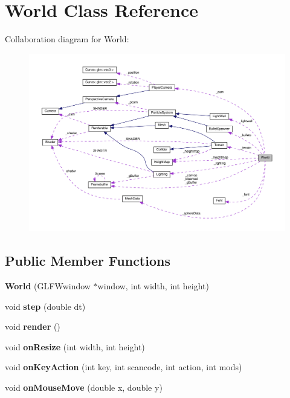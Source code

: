 \hypertarget{class_world}{}\section{World Class Reference}
\label{class_world}


Collaboration diagram for World\+:\nopagebreak
\begin{figure}[H]
\begin{center}
\leavevmode
\includegraphics[width=350pt]{class_world__coll__graph}
\end{center}
\end{figure}
\subsection*{Public Member Functions}
\begin{DoxyCompactItemize}
\item 
\hypertarget{class_world_abb6603de9dbfae29ea5d68e0aaa595eb}{}{\bfseries World} (G\+L\+F\+Wwindow $\ast$window, int width, int height)\label{class_world_abb6603de9dbfae29ea5d68e0aaa595eb}

\item 
\hypertarget{class_world_a04f0e47d71b690d9934fa697fa27ad9d}{}void {\bfseries step} (double dt)\label{class_world_a04f0e47d71b690d9934fa697fa27ad9d}

\item 
\hypertarget{class_world_a150eab10c21532162bb698d72aecec16}{}void {\bfseries render} ()\label{class_world_a150eab10c21532162bb698d72aecec16}

\item 
\hypertarget{class_world_a792c151ca90c5324db0c3322201ad4c1}{}void {\bfseries on\+Resize} (int width, int height)\label{class_world_a792c151ca90c5324db0c3322201ad4c1}

\item 
\hypertarget{class_world_a320b4008798e9e4c3ea2a9d77106ef40}{}void {\bfseries on\+Key\+Action} (int key, int scancode, int action, int mods)\label{class_world_a320b4008798e9e4c3ea2a9d77106ef40}

\item 
\hypertarget{class_world_a63c6c3ebb8258168b85922eb65b84bc6}{}void {\bfseries on\+Mouse\+Move} (double x, double y)\label{class_world_a63c6c3ebb8258168b85922eb65b84bc6}

\end{DoxyCompactItemize}
